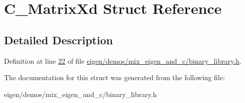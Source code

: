 \hypertarget{struct_c___matrix_xd}{}\section{C\+\_\+\+Matrix\+Xd Struct Reference}
\label{struct_c___matrix_xd}


\subsection{Detailed Description}


Definition at line \hyperlink{eigen_2demos_2mix__eigen__and__c_2binary__library_8h_source_l00022}{22} of file \hyperlink{eigen_2demos_2mix__eigen__and__c_2binary__library_8h_source}{eigen/demos/mix\+\_\+eigen\+\_\+and\+\_\+c/binary\+\_\+library.\+h}.



The documentation for this struct was generated from the following file\+:\begin{DoxyCompactItemize}
\item 
eigen/demos/mix\+\_\+eigen\+\_\+and\+\_\+c/binary\+\_\+library.\+h\end{DoxyCompactItemize}
